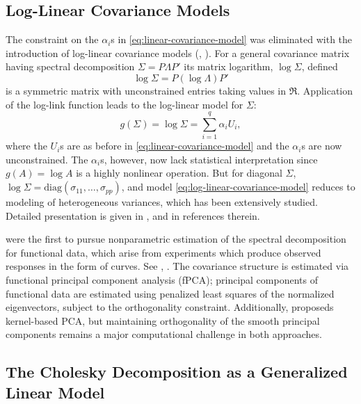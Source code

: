 \subsection{Log-Linear Covariance Models} \label{log-linear-glms}

The constraint on the $\alpha_i$s in \eqref{eq:linear-covariance-model} was eliminated with the introduction of log-linear covariance models (\cite{chiu1996matrix},  \cite{pinheiro1996unconstrained}). For a general covariance matrix having spectral decomposition $\Sigma = P \Lambda P'$ its matrix logarithm, $\log\Sigma$, defined 
\[
\log \Sigma = P\left( \log\Lambda \right)P'
\]
\noindent
is a symmetric matrix with unconstrained entries taking values in $\Re$. Application of the log-link function leads to the log-linear model for $\Sigma$:
\begin{equation} \label{eq:log-linear-covariance-model}
g\left(\Sigma\right)  = \log\Sigma  = \sum_{i = 1}^q \alpha_i U_i, 
\end{equation}
\noindent
where the $U_i$s are as before in \eqref{eq:linear-covariance-model} and the $\alpha_i$s are now unconstrained. The $\alpha_i$s, however, now lack statistical interpretation since $g\left(A\right) = \log A$ is a highly nonlinear operation. But for diagonal $\Sigma$, $\log \Sigma = \mbox{diag}\left(\sigma_{11},\dots, \sigma_{pp}\right)$, and model \eqref{eq:log-linear-covariance-model} reduces to modeling of heterogeneous variances, which has been extensively studied. Detailed presentation is given in \cite{carroll1988transformation}, \cite{verbyla1993modelling} and in references therein. 

\bigskip

\cite{rice1991estimating} were the first to pursue nonparametric estimation of the spectral decomposition for functional data, which arise from experiments which produce observed responses in the form of curves. See \cite{ramsay2006functional}, \cite{ramsay2007applied}. The covariance structure is estimated via functional principal component analysis (fPCA); principal components of functional data are estimated using penalized least squares of the normalized eigenvectors, subject to the orthogonality constraint. Additionally, \cite{boente2000kernel} proposeds kernel-based PCA, but maintaining orthogonality of the smooth principal components remains a major computational challenge in both approaches.

\subsection{The Cholesky Decomposition as a Generalized Linear Model}

